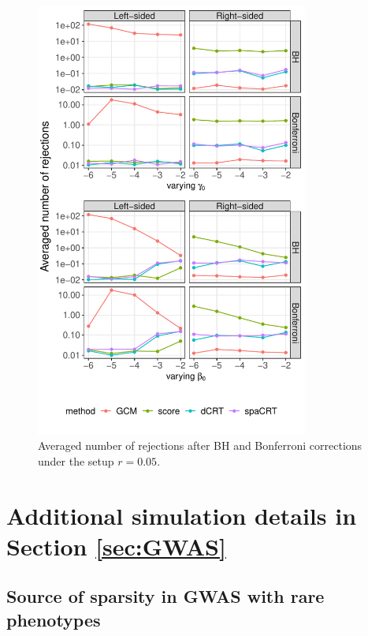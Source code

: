 \documentclass[12pt]{article}
\theoremstyle{definition}
\begin{document}
  \begin{figure}[!ht]
    \centering
    \includegraphics[width=0.8\textwidth]{figures-and-tables/simulation/NB-regression/FDR/disp-0.05-multiple_testing_rejection_plot.pdf}
    \caption{Averaged number of rejections after BH and Bonferroni corrections under the setup $r=0.05$.}
    \label{fig:simulation-CRISPR-screens-high-multiplicity-disp-0.05}
  \end{figure}
  
  
\clearpage

\section{Additional simulation details in Section \ref{sec:GWAS}}\label{sec:additional_details_GWAS}

\subsection{Source of sparsity in GWAS with rare phenotypes}\label{sec:source_sparsity_GWAS}
\end{document}
